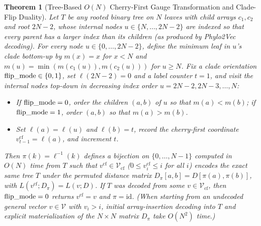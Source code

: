 \documentclass[11pt,a4paper]{article}
\makeatletter
\DeclareRobustCommand{\_}{\ifmmode\nfss@text{\textunderscore}\else\textunderscore\allowbreak\fi}
\newtheorem{theorem}{Theorem}[section]
\theoremstyle{definition}
\makeatother
\begin{document}
\begin{theorem}[Tree-Based $O(N)$ Cherry-First Gauge Transformation and Clade-Flip Duality]
\label{thm:relabel}
Let $T$ be any rooted binary tree on $N$ leaves with child arrays $c_1, c_2$ and root $2N-2$, whose internal nodes $u \in \{N, \dots, 2N-2\}$ are indexed so that every parent has a larger index than its children (as produced by Phylo2Vec decoding). For every node $u \in \{0, \dots, 2N-2\}$, define the minimum leaf in $u$'s clade bottom-up by $m(x) = x$ for $x < N$ and $m(u) = \min(m(c_1(u)), m(c_2(u)))$ for $u \ge N$. Fix a clade orientation $\text{flip\_mode} \in \{0, 1\}$, set $\ell(2N-2) = 0$ and a label counter $t = 1$, and visit the internal nodes top-down in decreasing index order $u = 2N-2, 2N-3, \dots, N$:
\begin{itemize}
    \item If $\text{flip\_mode} = 0$, order the children $(a, b)$ of $u$ so that $m(a) < m(b)$; if $\text{flip\_mode} = 1$, order $(a, b)$ so that $m(a) > m(b)$.
    \item Set $\ell(a) = \ell(u)$ and $\ell(b) = t$, record the cherry-first coordinate $v^{\text{cf}}_{t-1} = \ell(a)$, and increment $t$.
\end{itemize}
Then $\pi(k) = \ell^{-1}(k)$ defines a bijection on $\{0, \dots, N-1\}$ computed in $O(N)$ time from $T$ such that $v^{\text{cf}} \in \mathcal{V}_{\text{cf}}$ ($0 \le v^{\text{cf}}_i \le i$ for all $i$) encodes the exact same tree $T$ under the permuted distance matrix $D_\pi[a, b] = D[\pi(a), \pi(b)]$, with $L(v^{\text{cf}}; D_\pi) = L(v; D)$. If $T$ was decoded from some $v \in \mathcal{V}_{\text{cf}}$, then $\text{flip\_mode} = 0$ returns $v^{\text{cf}} = v$ and $\pi = \text{id}$. (When starting from an undecoded general vector $v \in \mathcal{V}$ with $v_i > i$, initial array-insertion decoding into $T$ and explicit materialization of the $N \times N$ matrix $D_\pi$ take $O(N^2)$ time.)
\end{theorem}
\end{document}
